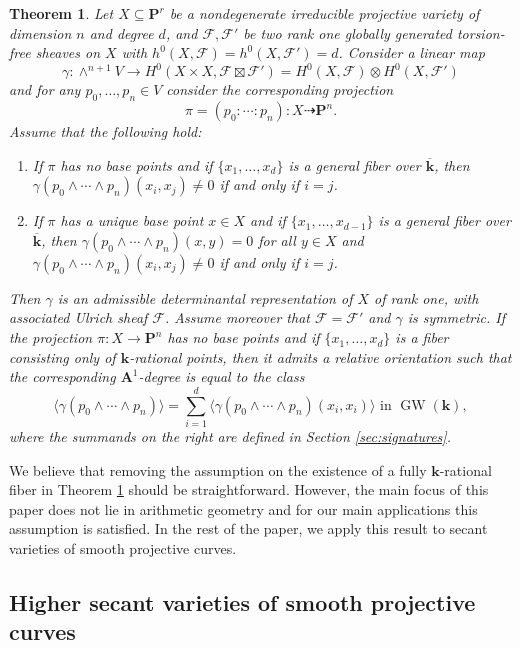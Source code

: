 \documentclass[12pt]{amsart}
\newtheorem{introthm}{Theorem}
\numberwithin{equation}{section}
\numberwithin{thmcounter}{section}
\theoremstyle{definition}
\theoremstyle{claim}
\newcommand{\kk}{\mathbf{k}}
\newcommand{\nP}{\mathbf{P}}
\newcommand{\nA}{\mathbf{A}}
\newcommand{\sF}{\mathscr{F}}
\DeclareMathOperator{\GW}{GW}
\begin{document}
\begin{introthm}\label{thm:thmA}
	Let $X\subseteq \nP^r$ be a nondegenerate irreducible projective variety of dimension $n$ and degree $d$, and $\sF,\sF'$ be two rank one globally generated torsion-free sheaves on $X$ with $h^0(X,\sF)=h^0(X,\sF')=d$. Consider a linear map
	\[ \gamma\colon \wedge^{n+1}V\longrightarrow H^0(X\times X,\sF\boxtimes \sF') = H^0(X,\sF)\otimes H^0(X,\sF') \]
	and for any $p_0,\ldots,p_n\in V$ consider the corresponding projection 
	\[ \pi = (p_0:\cdots:p_n)\colon X \dashrightarrow \nP^n . \]
	Assume that the following hold:
	\begin{enumerate}
		\item[(i)] If $\pi$ has no base points and if $\{x_1,\ldots,x_d\}$ is a general fiber over $\overline{\kk}$, then $\gamma(p_0\wedge \cdots \wedge p_n)(x_i,x_j)\ne 0$ if and only if $i=j$.
		\item[(ii)] If $\pi$ has a unique base point $x\in X$ and if $\{x_1,\ldots,x_{d-1}\}$ is a general fiber over $\overline{\kk}$, then $\gamma(p_0\wedge\cdots\wedge p_n)(x,y)=0$ for all $y\in X$ and $\gamma(p_0\wedge \cdots \wedge p_n)(x_i,x_j)\ne 0$ if and only if $i=j$.
	\end{enumerate}
Then $\gamma$ is an admissible determinantal representation of $X$ of rank one, with associated Ulrich sheaf $\sF$. Assume moreover that $\sF=\sF'$ and $\gamma$ is symmetric. If the projection $\pi\colon X\to \nP^n$ has no base points and if $\{x_1,\ldots,x_d\}$ is a fiber consisting only of $\kk$-rational points, then it admits a relative orientation such that the corresponding $\nA^1$-degree is equal to the class
\[ \langle \gamma(p_0\wedge \cdots \wedge p_n) \rangle = \sum_{i=1}^{d} \langle \gamma(p_0\wedge \cdots\wedge p_n)(x_i,x_i) \rangle \text{ in } \GW(\kk), \]
where the summands on the right are defined in Section \ref{sec:signatures}.
\end{introthm}

We believe that removing the assumption on the existence of a fully $\kk$-rational fiber in Theorem \ref{thm:thmA} should be straightforward. However, the main focus of this paper does not lie in arithmetic geometry and for our main applications this assumption is satisfied.
In the rest of the paper, we apply this result to secant varieties of smooth projective curves.

\subsection{Higher secant varieties of smooth projective curves}
\end{document}
